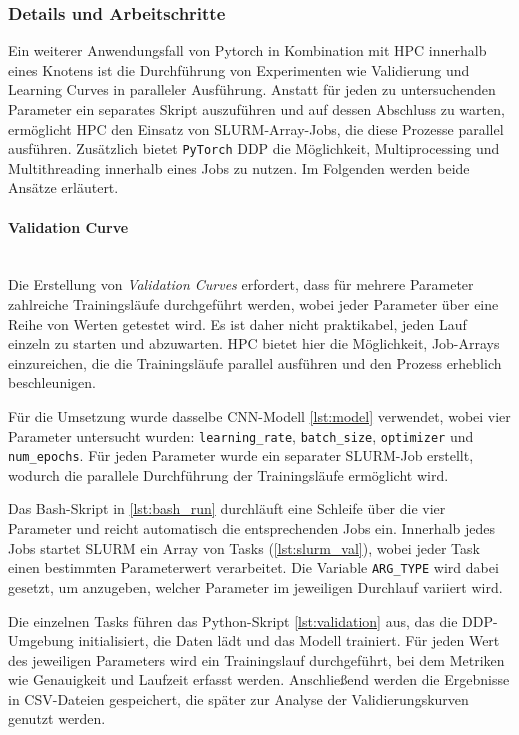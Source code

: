 \documentclass{article}
\begin{document}
\subsubsection{Details und Arbeitschritte}
Ein weiterer Anwendungsfall von Pytorch in Kombination mit HPC innerhalb eines Knotens ist die Durchführung von 
Experimenten wie Validierung und Learning Curves in paralleler Ausführung.  
Anstatt für jeden zu untersuchenden Parameter ein separates Skript auszuführen und auf dessen Abschluss zu warten, 
ermöglicht HPC den Einsatz von SLURM-Array-Jobs, die diese Prozesse parallel ausführen.  
Zusätzlich bietet \texttt{PyTorch} DDP die Möglichkeit, Multiprocessing und Multithreading innerhalb eines Jobs zu nutzen. 
Im Folgenden werden beide Ansätze erläutert.

\paragraph{Validation Curve} \mbox{} \\ 
Die Erstellung von \textit{Validation Curves} erfordert, dass für mehrere Parameter zahlreiche Trainingsläufe durchgeführt werden, 
wobei jeder Parameter über eine Reihe von Werten getestet wird. Es ist daher nicht praktikabel, jeden Lauf einzeln zu starten und abzuwarten.  
HPC bietet hier die Möglichkeit, Job-Arrays einzureichen, die die Trainingsläufe parallel ausführen und den Prozess erheblich beschleunigen.

Für die Umsetzung wurde dasselbe CNN-Modell \ref{lst:model} verwendet, wobei vier Parameter untersucht wurden: 
\texttt{learning\_rate}, \texttt{batch\_size}, \texttt{optimizer} und \texttt{num\_epochs}.  
Für jeden Parameter wurde ein separater SLURM-Job erstellt, wodurch die parallele Durchführung der Trainingsläufe ermöglicht wird.


Das Bash-Skript in \ref{lst:bash_run} durchläuft eine Schleife über die vier Parameter 
und reicht automatisch die entsprechenden Jobs ein. Innerhalb jedes Jobs startet SLURM ein Array von Tasks
(\ref{lst:slurm_val}), wobei jeder Task einen bestimmten Parameterwert verarbeitet. Die Variable \texttt{ARG\_TYPE}
wird dabei gesetzt, um anzugeben, welcher Parameter im jeweiligen Durchlauf variiert wird.

Die einzelnen Tasks führen das Python-Skript \ref{lst:validation} aus, das die DDP-Umgebung 
initialisiert, die Daten lädt und das Modell trainiert. Für jeden Wert des jeweiligen Parameters wird 
ein Trainingslauf durchgeführt, bei dem Metriken wie Genauigkeit und Laufzeit erfasst werden. Anschließend werden die 
Ergebnisse in CSV-Dateien gespeichert, die später zur Analyse der Validierungskurven genutzt werden.
\end{document}
